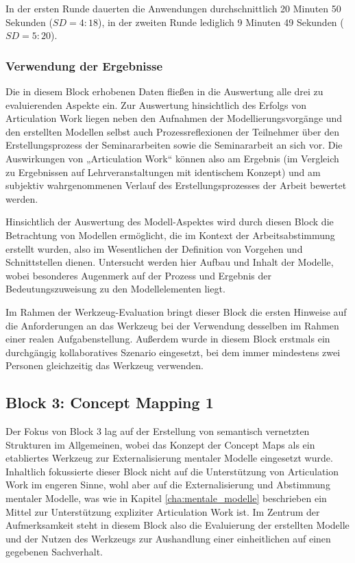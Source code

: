 In der ersten Runde dauerten die Anwendungen durchschnittlich 20 Minuten 50 Sekunden ($SD=4:18$), in der zweiten Runde lediglich 9 Minuten 49 Sekunden ($SD=5:20$).


\subsubsection{Verwendung der Ergebnisse} %
\label{ssub:2_verwendung_der_ergebnisse}

Die in diesem Block erhobenen Daten fließen in die Auswertung alle drei zu evaluierenden Aspekte ein. Zur Auswertung hinsichtlich des Erfolgs von Articulation Work liegen neben den Aufnahmen der Modellierungsvorgänge und den erstellten Modellen selbst auch Prozessreflexionen der Teilnehmer über den Erstellungsprozess der Seminararbeiten sowie die Seminararbeit an sich vor. Die Auswirkungen von „Articulation Work“ können also am Ergebnis (im Vergleich zu Ergebnissen auf Lehrveranstaltungen mit identischem Konzept) und am subjektiv wahrgenommenen Verlauf des Erstellungsprozesses der Arbeit bewertet werden.

Hinsichtlich der Auswertung des Modell-Aspektes wird durch diesen Block die Betrachtung von Modellen ermöglicht, die im Kontext der Arbeitsabstimmung erstellt wurden, also im Wesentlichen der Definition von Vorgehen und Schnittstellen dienen. Untersucht werden hier Aufbau und Inhalt der Modelle, wobei besonderes Augenmerk auf der Prozess und Ergebnis der Bedeutungszuweisung zu den Modellelementen liegt.

Im Rahmen der Werkzeug-Evaluation bringt dieser Block die ersten Hinweise auf die Anforderungen an das Werkzeug bei der Verwendung desselben im Rahmen einer realen Aufgabenstellung. Außerdem wurde in diesem Block erstmals ein durchgängig kollaboratives Szenario eingesetzt, bei dem immer mindestens zwei Personen gleichzeitig das Werkzeug verwenden.


\subsection{Block 3: Concept Mapping 1}
\label{sub:eval_3}

Der Fokus von Block 3 lag auf der Erstellung von semantisch vernetzten Strukturen im Allgemeinen, wobei das Konzept der Concept Maps als ein etabliertes Werkzeug zur Externalisierung mentaler Modelle eingesetzt wurde. Inhaltlich fokussierte dieser Block nicht auf die Unterstützung von Articulation Work im engeren Sinne, wohl aber auf die Externalisierung und Abstimmung mentaler Modelle, was wie in Kapitel \ref{cha:mentale_modelle} beschrieben ein Mittel zur Unterstützung expliziter Articulation Work ist. Im Zentrum der Aufmerksamkeit steht in diesem Block also die Evaluierung der erstellten Modelle und der Nutzen des Werkzeugs zur Aushandlung einer einheitlichen auf einen gegebenen Sachverhalt.

